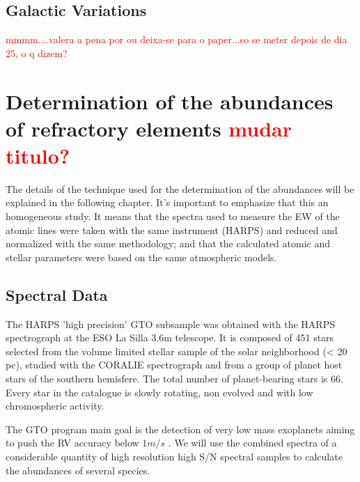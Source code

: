 \documentclass[dvips,12pt,a4paper]{report}
\begin{document}
{%

\section{Galactic Variations}
\textcolor{red}{mmmm....valera a pena por ou deixa-se para o paper...so se meter depois de dia 25, o q dizem?}


\chapter {Determination of the abundances of refractory elements \textcolor{red}{mudar titulo?}}

The details of the technique used for the determination of the abundances will be explained in the following chapter.  It's important to emphasize that this an homogeneous study. It means that the spectra used to measure the EW of the atomic lines were taken with the same instrument (HARPS) and reduced and normalized with the same methodology; and that the calculated atomic and stellar parameters were based on the same atmospheric models.

\section {Spectral Data}

The HARPS 'high precision' GTO subsample was obtained with the HARPS spectrograph at the ESO La Silla 3.6m telescope. It is composed of 451 stars selected from the volume limited stellar sample of the solar neighborhood (< 20 pc), studied with the CORALIE spectrograph \citep{Udry-2000} and from a group of planet host stars of the southern hemisfere. The total number of planet-bearing stars  is 66. Every star in the catalogue is slowly rotating, non evolved and with low chromospheric activity. 

The GTO program main goal is the detection of very low mass exoplanets aiming to push the RV accuracy below $1m/s$ \citep{Mayor-2003b}. We will use the combined spectra of a considerable quantity of high resolution high S/N spectral samples to calculate the abundances of several species. 

}
\end{document}
